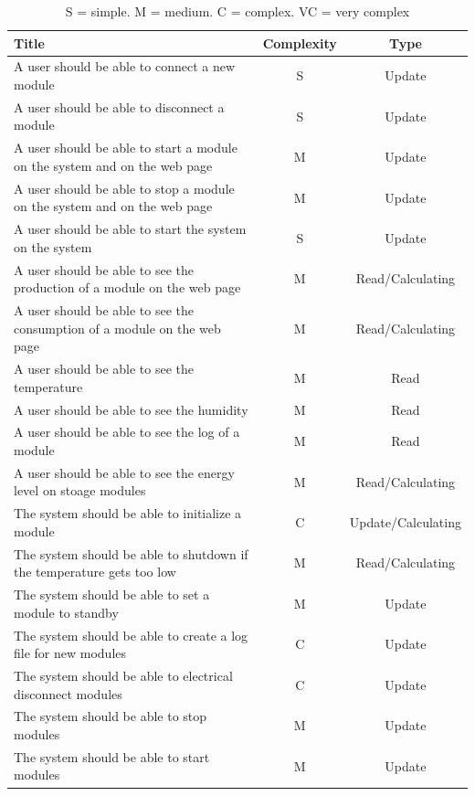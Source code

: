		\begin{table}[h!]
			\begin{tabular}{| l | c | c |}
				\hline
	Title																	& Complexity 		& Type			\\ \hline
	A user should be able to connect a new module								& S				& Update 			\\ \hline
	A user should be able to disconnect a module									& S				& Update	 		\\ \hline
	A user should be able to start a module on the system and on the web page			& M				& Update 			\\ \hline
	A user should be able to stop a module on the system and on the web page			& M				& Update 			\\ \hline
	A user should be able to start the system on the system							& S				& Update 			\\ \hline
	A user should be able to see the production of a module on the web page			& M				& Read/Calculating 	\\ \hline
	A user should be able to see the consumption of a module on the web page			& M				& Read/Calculating 	\\ \hline
	A user should be able to see the temperature									& M				& Read 			\\ \hline
	A user should be able to see the humidity										& M				& Read			\\ \hline
	A user should be able to see the log of a module								& M				& Read			\\ \hline
	A user should be able to see the energy level on stoage modules					& M				& Read/Calculating 	\\ \hline
	The system should be able to initialize a module								& C				& Update/Calculating\\ \hline
	The system should be able to shutdown if the temperature gets too low				& M				& Read/Calculating 	\\ \hline
	The system should be able to set a module to standby							& M				& Update 			\\ \hline
	The system should be able to create a log file for new modules					& C				& Update 			\\ \hline
	The system should be able to electrical disconnect modules						& C				& Update 			\\ \hline
	The system should be able to stop modules									& M				& Update	 		\\ \hline
	The system should be able to start modules									& M				& Update		 	\\ \hline
				\end{tabular}
				\caption{S = simple. M = medium. C = complex. VC = very complex}
			\end{table}
